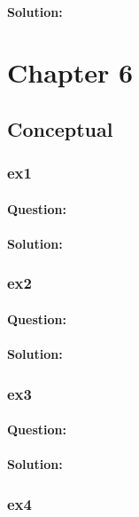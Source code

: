 \documentclass[a4paper,12pt,titlepage]{article} %
\begin{document}
\paragraph{Solution:}


\newpage
\section{Chapter 6}
\subsection{Conceptual}
\subsubsection{ex1}
\paragraph{Question:}

\paragraph{Solution:}

\subsubsection{ex2}
\paragraph{Question:}

\paragraph{Solution:}

\subsubsection{ex3}
\paragraph{Question:}

\paragraph{Solution:}

\subsubsection{ex4}
\end{document}
